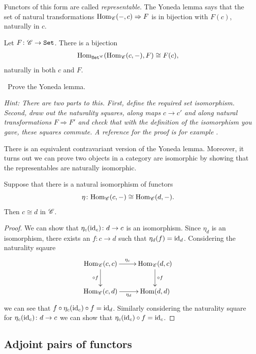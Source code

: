\documentclass{article}[11pt]
\begin{document}
Functors of this form are called \emph{representable}. The Yoneda lemma says that the set of natural transformations
$\textup{Hom}_{\mathscr{C}}(-,c)\Rightarrow F$ is in bijection with $F(c)$, naturally
in $c$.
\begin{lemma} Let $F\colon \mathscr{C} \to \texttt{Set}$. There is a bijection
\begin{align*}
	\textup{Hom}_{\texttt{Set}^{\mathscr{C}}}(\textup{Hom}_{\mathscr{C}} (c,-), F) \cong F(c),
\end{align*}
naturally in both $c$ and $F$.
\end{lemma}

\begin{exercise} $\ $
Prove the Yoneda lemma.

\emph{Hint: There are two parts to this. First, define the required set isomorphism. Second, draw out the naturality squares, along maps $c\to c'$ and along natural transformations $F\Rightarrow F'$ and check that with the definition  of the isomorphism you gave, these squares commute.  A reference for the proof is for example \cite[Lemma 2.5]{mehrle}.}
\end{exercise}
There is an equivalent contravariant version of the Yoneda lemma. Moreover, it turns out we can prove two objects in a category are isomorphic by showing that the representables are naturally isomorphic.

\begin{lemma}
Suppose that there is a natural isomorphism of functors $$\eta\colon \textup{Hom}_{\mathscr{C}}(c, -)\cong \textup{Hom}_{\mathscr{C}}(d, -).$$ Then $c\cong d$ in $\mathscr{C}$.
\end{lemma}

\begin{proof}
We can show that $\eta_c(\text{id}_c)\colon d\to c$ is an isomorphism. Since $\eta_d$ is an isomorphism, there exists an $f\colon c\to d$ such that $\eta_d(f)=\text{id}_d$. Considering the naturality sqaure
\[\xymatrix{
\Hom_\C(c,c)\ar[r]^-{\eta_c}\ar[d]_-{\circ f}  & \Hom_\C(d,c) \ar[d]^-{\circ f} \\
\Hom_\C(c,d) \ar[r]_-{\eta_d}& \Hom(d,d)
}\]  we can see that $f\circ \eta_c(\text{id}_c)\circ f=\text{id}_d$. Similarly considering the naturality square for $\eta_c(\text{id}_c)\colon d\to c$ we can show that $\eta_c(\text{id}_c)\circ f=\text{id}_c$.
\end{proof}

\subsection{Adjoint pairs of functors}
\end{document}

